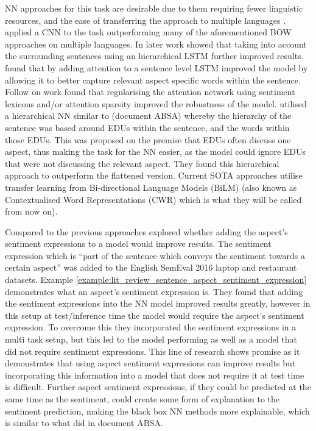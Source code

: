 NN approaches for this task are desirable due to them requiring fewer linguistic resources, and the ease of transferring the approach to multiple languages \citep{ruder-etal-2016-insight-1}. \citet{ruder-etal-2016-insight-1} applied a CNN to the task outperforming many of the aforementioned BOW approaches on multiple languages. In later work \citet{ruder-etal-2016-hierarchical} showed that taking into account the surrounding sentences using an hierarchical LSTM further improved results. \citet{wang-etal-2016-attention} found that by adding attention to a sentence level LSTM improved the model by allowing it to better capture relevant aspect specific words within the sentence. Follow on work \citep{bao-etal-2019-attention} found that regularising the attention network using sentiment lexicons and/or attention sparsity improved the robustness of the model. \citet{wang2018aspect} utilised a hierarchical NN similar to \citet{yin-etal-2017-document} (document ABSA) whereby the hierarchy of the sentence was based around EDUs within the sentence, and the words within those EDUs. This was proposed on the premise that EDUs often discuss one aspect, thus making the task for the NN easier, as the model could ignore EDUs that were not discussing the relevant aspect. They found this hierarchical approach to outperform the flattened version. Current SOTA approaches utilise transfer learning from Bi-directional Language Models (BiLM) \citep{sun-etal-2019-utilizing, jiang-etal-2019-challenge} (also known as Contextualised Word Representations (CWR) which is what they will be called from now on).

Compared to the previous approaches \citet{kaljahi-foster-2018-sentiment} explored whether adding the aspect's sentiment expressions to a model would improve results. The sentiment expression which is ``part of the sentence which conveys the sentiment towards a certain aspect'' \citep{kaljahi-foster-2018-sentiment} was added to the English SemEval 2016 laptop and restaurant datasets. Example \ref{example:lit_review_sentence_aspect_sentiment_expression} demonstrates what an aspect's sentiment expression is. They found that adding the sentiment expressions into the NN model improved results greatly, however in this setup at test/inference time the model would require the aspect's sentiment expression. To overcome this they incorporated the sentiment expressions in a multi task setup, but this led to the model performing as well as a model that did not require sentiment expressions. This line of research shows promise as it demonstrates that using aspect sentiment expressions can improve results but incorporating this information into a model that does not require it at test time is difficult. Further aspect sentiment expressions, if they could be predicted at the same time as the sentiment, could create some form of explanation to the sentiment prediction, making the black box NN methods more explainable, which is similar to what \citet{lei-etal-2016-rationalizing} did in document ABSA.

